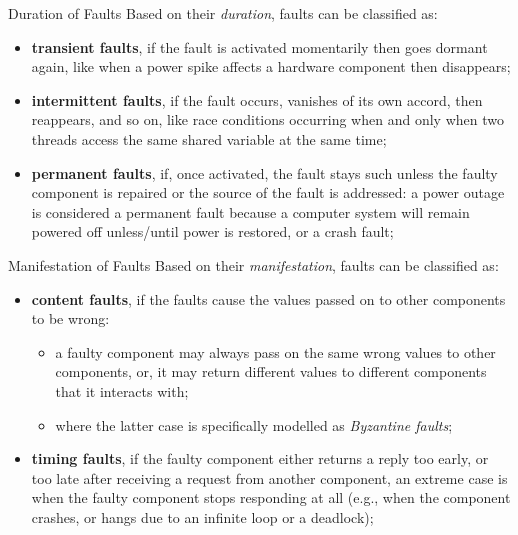 \documentclass[11pt, a4paper]{article}
\begin{document}
\begin{definition}{Duration of Faults}{}
    Based on their \textit{duration}, faults can be classified as:
    \begin{itemize}
        \item \textbf{transient faults}, if the fault is activated momentarily then goes dormant again, like when a power spike affects a hardware component then disappears;
        \item \textbf{intermittent faults}, if the fault occurs, vanishes of its own accord, then reappears, and so on, like race conditions occurring when and only when two threads access the same shared variable at the same time;
        \item \textbf{permanent faults}, if, once activated, the fault stays such unless the faulty component is repaired or the source of the fault is addressed: a power outage is considered a permanent fault because a computer system will remain powered off unless/until power is restored, or a crash fault;
    \end{itemize}
\end{definition}
\begin{definition}{Manifestation of Faults}{}
    Based on their \textit{manifestation}, faults can be classified as:
    \begin{itemize}
        \item \textbf{content faults}, if the faults cause the values passed on to other components to be wrong:
        \begin{itemize}
            \item a faulty component may always pass on the same wrong values to other components, or, it may return different values to different components that it interacts with;
            \item where the latter case is specifically modelled as \textit{Byzantine faults};
        \end{itemize}
        \item \textbf{timing faults}, if the faulty component either returns a reply too early, or too late after receiving a request from another component, an extreme case is when the faulty component stops responding at all (e.g., when the component crashes, or hangs due to an infinite loop or a deadlock);
\end{itemize}
\end{definition}
\end{document}
